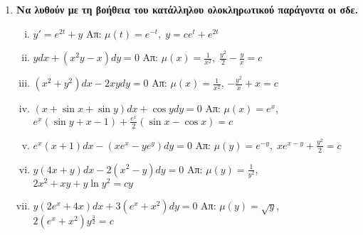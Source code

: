 \documentclass[a4paper,table]{report}
\begin{document}
\begin{enumerate}
  \item {\bfseries Να λυθούν με τη βοήθεια του κατάλληλου ολοκληρωτικού 
    παράγοντα οι σδε.}
    \begin{enumerate}[i)]
      \item $ y' = e^{2t}+y $ \hfill Απ: $ \mu (t) = e^{-t}, \; y=ce^{t}+e^{2t} $ 
      \item $ ydx+(x^{2}y-x)dy=0 $ \hfill Απ: $ \mu (x) = \frac{1}{x^{2}}, \;
        \frac{y^{2}}{2} - \frac{y}{x} = c $ 
      \item $ (x^{2}+y^{2})dx - 2xydy = 0 $ 
        \hfill Απ: $\mu(x)= \frac{1}{x^{2}}$, $ - \frac{y^{2}}{x} + x = c $
      \item $ (x + \sin{x} + \sin{y})dx + \cos{y} dy =0 $ 
        \hfill Απ: $\mu(x)=e^{x} $, $ e^x(\sin{y} + x-1) + \frac{e^{x}}{2} 
        (\sin{x} - \cos{x})=c $
      \item $ e^{x}(x+1)dx - (xe^{x}-ye^{y})dy = 0 $
        \hfill Απ: $\mu(y) = e^{-y}, \; xe^{x-y} + \frac{y^{2}}{2} = c $
      \item $ y(4x+y)dx-2(x^{2}-y)dy=0 $ 
        \hfill Απ: $ \mu(y)= \frac{1}{y^{2}} $, $ 2x^{2}+xy+ y \ln{y^{2}} =cy$ 
      \item $ y(2e^{x}+4x)dx + 3(e^{x}+x^{2})dy = 0 $ 
        \hfill Απ: $ \mu(y)= \sqrt{ y } $, $ 2(e^{x}+x^{2})y^{\frac{3}{2}}=c $ 
    \end{enumerate}




\end{enumerate}
\end{document}
